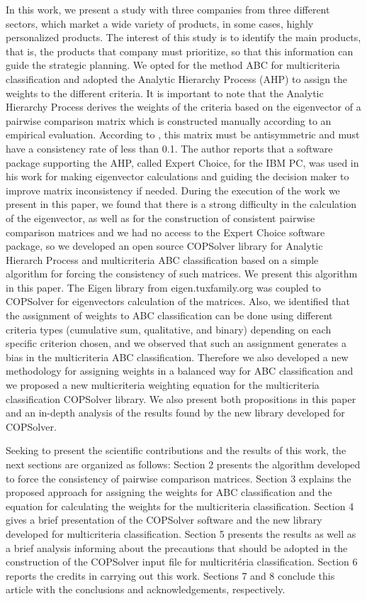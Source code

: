 \documentclass[10pt,fleqn,a4paper,twoside]{article}
\begin{document}
		In this work, we present a study with three companies from three different sectors, which market a wide variety of products, in some cases, highly personalized products. The interest of this study is to identify the main products, that is, the products that company must prioritize, so that this information can guide the strategic planning. We opted for the method ABC for multicriteria classification and adopted the Analytic Hierarchy Process (AHP) \citep{Saaty1987} to assign the weights to the different criteria. It is important to note that the Analytic Hierarchy Process derives the weights of the criteria based on the eigenvector of a pairwise comparison matrix which is constructed manually according to an empirical evaluation. According to \cite{Saaty1987}, this matrix must be antisymmetric and must have a consistency rate of less than 0.1.  The author reports that a software package supporting the AHP, called Expert Choice, for the IBM PC, was used in his work for making eigenvector calculations and guiding the decision maker to improve matrix inconsistency if needed. During the execution of the work we present in this paper, we found that there is a strong difficulty in the calculation of the eigenvector, as well as for the construction of consistent pairwise comparison matrices and we had no access to the Expert Choice software package, so we developed an open source COPSolver library for Analytic Hierarch Process and multicriteria ABC classification based on a simple algorithm for forcing the consistency of such matrices. We present this algorithm in this paper. The Eigen library from eigen.tuxfamily.org was coupled to COPSolver for eigenvectors calculation of the matrices. Also, we identified that the assignment of weights to ABC classification can be done using different criteria types (cumulative sum, qualitative, and binary) depending on each specific criterion chosen, and we observed that such an assignment generates a bias in the multicriteria ABC classification. Therefore we also developed a new methodology for assigning weights in a balanced way for ABC classification and we proposed a new multicriteria weighting equation for the multicriteria classification COPSolver library. We also present both propositions in this paper and an in-depth analysis of the results found by the new library developed for COPSolver.
		
		Seeking to present the scientific contributions and the results of this work, the next sections are organized as follows: Section 2 presents the algorithm developed to force the consistency of pairwise comparison matrices. Section 3 explains the proposed approach for assigning the weights for ABC classification and the equation for calculating the weights for the multicriteria classification. Section 4 gives a brief presentation of the COPSolver software and the new library developed for multicriteria classification. Section 5 presents the results as well as a brief analysis informing about the precautions that should be adopted in the construction of the COPSolver input file for multicritéria classification. Section 6 reports the credits in carrying out this work. Sections 7 and 8 conclude this article with the conclusions and acknowledgements, respectively.
    
\end{document}
